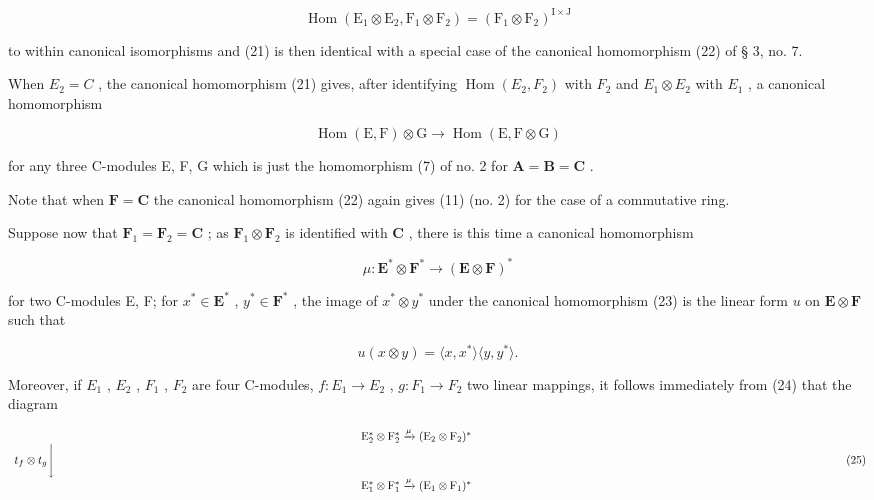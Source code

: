 \[
\operatorname{Hom} \left(\mathrm{E} _ {1} \otimes \mathrm{E} _ {2}, \mathrm{F} _ {1} \otimes \mathrm{F} _ {2}\right) = \left(\mathrm{F} _ {1} \otimes \mathrm{F} _ {2}\right) ^ {\mathrm{I} \times \mathrm{J}}
\]

to within canonical isomorphisms and (21) is then identical with a special case of the canonical homomorphism (22) of § 3, no. 7.

When \(E_{2} = C\) , the canonical homomorphism (21) gives, after identifying \(\operatorname{Hom}(E_{2}, F_{2})\) with \(F_{2}\) and \(E_{1} \otimes E_{2}\) with \(E_{1}\) , a canonical homomorphism

\[
\operatorname{Hom} (\mathrm{E}, \mathrm{F}) \otimes \mathrm{G} \rightarrow \operatorname{Hom} (\mathrm{E}, \mathrm{F} \otimes \mathrm{G})\tag{22}
\]

for any three C-modules E, F, G which is just the homomorphism (7) of no. 2 for \(\mathbf{A} = \mathbf{B} = \mathbf{C}\) .

Note that when \(\mathbf{F} = \mathbf{C}\) the canonical homomorphism (22) again gives (11) (no. 2) for the case of a commutative ring.

Suppose now that \(\mathbf{F}_1 = \mathbf{F}_2 = \mathbf{C}\) ; as \(\mathbf{F}_1 \otimes \mathbf{F}_2\) is identified with \(\mathbf{C}\) , there is this time a canonical homomorphism

\[
\mu : \mathbf {E} ^ {*} \otimes \mathbf {F} ^ {*} \rightarrow (\mathbf {E} \otimes \mathbf {F}) ^ {*}\tag{23}
\]

for two C-modules E, F; for \(x^{*} \in \mathbf{E}^{*}\) , \(y^{*} \in \mathbf{F}^{*}\) , the image of \(x^{*} \otimes y^{*}\) under the canonical homomorphism (23) is the linear form \(u\) on \(\mathbf{E} \otimes \mathbf{F}\) such that

\[
u (x \otimes y) = \langle x, x ^ {*} \rangle \langle y, y ^ {*} \rangle .\tag{24}
\]

Moreover, if \(E_{1}\) , \(E_{2}\) , \(F_{1}\) , \(F_{2}\) are four C-modules, \(f: E_{1} \rightarrow E_{2}\) , \(g: F_{1} \rightarrow F_{2}\) two linear mappings, it follows immediately from (24) that the diagram

\[
\begin{array}{c} \mathrm{E} _ {2} ^ {*} \otimes \mathrm{F} _ {2} ^ {*} \xrightarrow {\mu} (\mathrm{E} _ {2} \otimes \mathrm{F} _ {2}) ^ {*} \\ t _ {f} \otimes t _ {g} \Biggl \downarrow \qquad \qquad \qquad \qquad \qquad \qquad \qquad \qquad \qquad \qquad \qquad \qquad \qquad \qquad \qquad \qquad \qquad \qquad \qquad \qquad \qquad \qquad \qquad \qquad \qquad \qquad \qquad \qquad \qquad \qquad \qquad \qquad \qquad \qquad \\ \mathrm{E} _ {1} ^ {*} \otimes \mathrm{F} _ {1} ^ {*} \xrightarrow {\mu} (\mathrm{E} _ {1} \otimes \mathrm{F} _ {1}) ^ {*} \end{array}\tag{25}
\]

